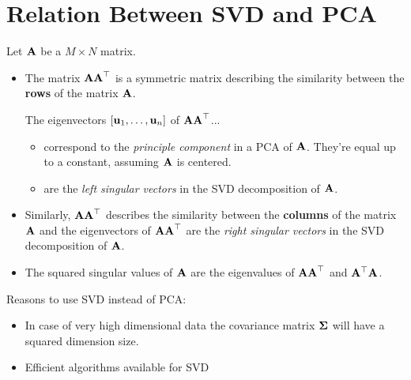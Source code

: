 \section{Relation Between SVD and PCA}
Let \(\mathbf{A}\) be a \(M \times N\) matrix.
\begin{itemize}
\item The matrix \(\mathbf{AA}^\top\) is a symmetric matrix describing the similarity between the \textbf{rows} of the matrix \(\mathbf{A}\).

The eigenvectors \([\mathbf{u}_1, \ldots, \mathbf{u}_n]\) of \(\mathbf{AA}^\top\)...
\begin{itemize}
\item correspond to the \textit{principle component} in a PCA of \(\mathbf{A}\). They're equal up to a constant, assuming \(\mathbf{A}\) is centered.
\item are the \textit{left singular vectors} in the SVD decomposition of \(\mathbf{A}\).
\end{itemize}

\item Similarly, \(\mathbf{AA}^\top\) describes the similarity between the \textbf{columns} of the matrix \(\mathbf{A}\) and the eigenvectors of \(\mathbf{AA}^\top\) are the \textit{right singular vectors} in the SVD decomposition of \(\mathbf{A}\).

\item The squared singular values of \(\mathbf{A}\) are the eigenvalues of \(\mathbf{AA}^\top\) and \(\mathbf{A}^\top \mathbf{A}\).
\end{itemize}

Reasons to use SVD instead of PCA:
\begin{itemize}
\item In case of very high dimensional data the covariance matrix \(\mathbf{\Sigma}\) will have a squared dimension size.
\item Efficient algorithms available for SVD
\end{itemize}